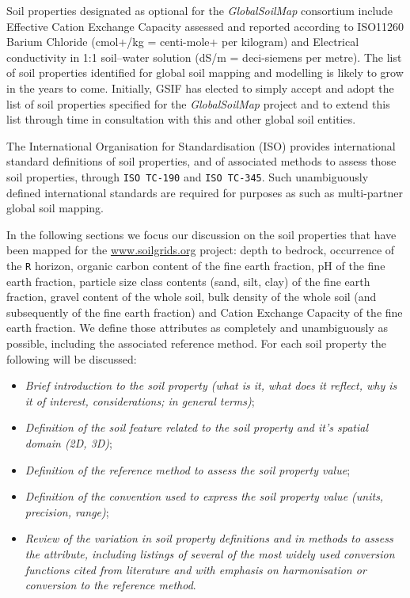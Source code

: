 \documentclass[11pt]{krantz}
\theoremstyle{definition}
\theoremstyle{definition}
\theoremstyle{definition}
\theoremstyle{remark}
\begin{document}
Soil properties designated as optional for the \emph{GlobalSoilMap}
consortium include Effective Cation Exchange Capacity assessed and
reported according to ISO11260 Barium Chloride (cmol+/kg = centi-mole+
per kilogram) and Electrical conductivity in 1:1 soil--water solution
(dS/m = deci-siemens per metre). The list of soil properties identified
for global soil mapping and modelling is likely to grow in the years to
come. Initially, GSIF has elected to simply accept and adopt the list of
soil properties specified for the \emph{GlobalSoilMap} project and to
extend this list through time in consultation with this and other global
soil entities.

The International Organisation for Standardisation (ISO) provides
international standard definitions of soil properties, and of associated
methods to assess those soil properties, through \texttt{ISO\ TC-190}
and \texttt{ISO\ TC-345}. Such unambiguously defined international
standards are required for purposes as such as multi-partner global soil
mapping.

In the following sections we focus our discussion on the soil properties
that have been mapped for the \url{www.soilgrids.org} project: depth to
bedrock, occurrence of the \texttt{R} horizon, organic carbon content of
the fine earth fraction, pH of the fine earth fraction, particle size
class contents (sand, silt, clay) of the fine earth fraction, gravel
content of the whole soil, bulk density of the whole soil (and
subsequently of the fine earth fraction) and Cation Exchange Capacity of
the fine earth fraction. We define those attributes as completely and
unambiguously as possible, including the associated reference method.
For each soil property the following will be discussed:

\begin{itemize}
\item
  \emph{Brief introduction to the soil property (what is it, what does
  it reflect, why is it of interest, considerations; in general terms)};
\item
  \emph{Definition of the soil feature related to the soil property and
  it's spatial domain (2D, 3D)};
\item
  \emph{Definition of the reference method to assess the soil property
  value};
\item
  \emph{Definition of the convention used to express the soil property
  value (units, precision, range)};
\item
  \emph{Review of the variation in soil property definitions and in
  methods to assess the attribute, including listings of several of the
  most widely used conversion functions cited from literature and with
  emphasis on harmonisation or conversion to the reference method}.
\end{itemize}
\end{document}
